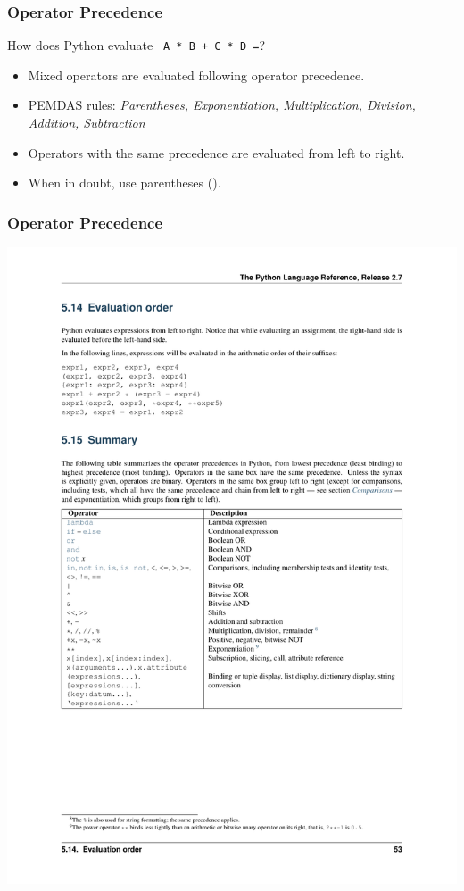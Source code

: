 \documentclass{beamer}
\begin{document}
\begin{frame}[fragile]
\frametitle{Operator  Precedence}
How does Python evaluate \verb! A * B + C * D =!?

\begin{itemize}
\item Mixed operators are evaluated following operator precedence.
\item \alert{ PEMDAS} rules: \textit{Parentheses, Exponentiation, Multiplication, Division, Addition, Subtraction} 
\item  Operators with the same precedence are evaluated from \alert{left to 
right}. 
\item When in doubt, use parentheses ().
\end{itemize}
\end{frame}
\begin{frame}[fragile]
\frametitle{Operator  Precedence}
\centerline{\includegraphics[width=\textwidth]{operator_precedence}}
\end{frame}
\end{document}
